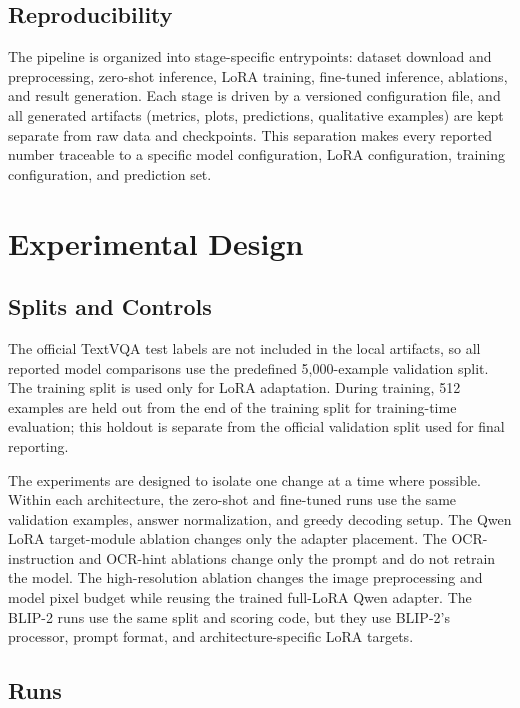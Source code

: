 \documentclass[11pt]{article}
\begin{document}
\subsection{Reproducibility}

The pipeline is organized into stage-specific entrypoints: dataset download and preprocessing, zero-shot inference, LoRA training, fine-tuned inference, ablations, and result generation. Each stage is driven by a versioned configuration file, and all generated artifacts (metrics, plots, predictions, qualitative examples) are kept separate from raw data and checkpoints. This separation makes every reported number traceable to a specific model configuration, LoRA configuration, training configuration, and prediction set.

\section{Experimental Design}

\subsection{Splits and Controls}

The official TextVQA test labels are not included in the local artifacts, so all reported model comparisons use the predefined 5,000-example validation split. The training split is used only for LoRA adaptation. During training, 512 examples are held out from the end of the training split for training-time evaluation; this holdout is separate from the official validation split used for final reporting.

The experiments are designed to isolate one change at a time where possible. Within each architecture, the zero-shot and fine-tuned runs use the same validation examples, answer normalization, and greedy decoding setup. The Qwen LoRA target-module ablation changes only the adapter placement. The OCR-instruction and OCR-hint ablations change only the prompt and do not retrain the model. The high-resolution ablation changes the image preprocessing and model pixel budget while reusing the trained full-LoRA Qwen adapter. The BLIP-2 runs use the same split and scoring code, but they use BLIP-2's processor, prompt format, and architecture-specific LoRA targets.

\newpage
\subsection{Runs}
\end{document}
